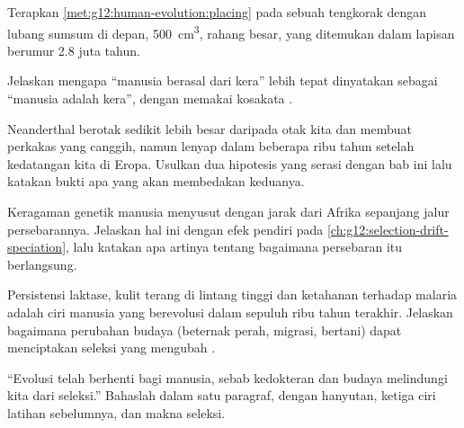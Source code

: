 \begin{exercise}[$\star\star$]\label{exo:g12:human-evolution:10}
Terapkan \cref{met:g12:human-evolution:placing} pada sebuah tengkorak
dengan lubang sumsum di depan, \qty{500}{cm^3}, rahang besar, yang
ditemukan dalam lapisan berumur 2.8 juta tahun.
\end{exercise}

\begin{exercise}[$\star\star$]\label{exo:g12:human-evolution:11}
Jelaskan mengapa ``manusia berasal dari kera'' lebih tepat dinyatakan
sebagai ``manusia adalah kera'', dengan memakai kosakata .
\end{exercise}

\begin{exercise}[$\star\star\star$]\label{exo:g12:human-evolution:12}
Neanderthal berotak sedikit lebih besar daripada otak kita dan membuat
perkakas yang canggih, namun lenyap dalam beberapa ribu tahun setelah
kedatangan kita di Eropa. Usulkan dua hipotesis yang serasi dengan bab
ini lalu katakan bukti apa yang akan membedakan keduanya.
\end{exercise}

\begin{exercise}[$\star\star\star$]\label{exo:g12:human-evolution:13}
Keragaman genetik manusia menyusut dengan jarak dari Afrika sepanjang
jalur persebarannya. Jelaskan hal ini dengan efek pendiri pada
\cref{ch:g12:selection-drift-speciation}, lalu katakan apa artinya
tentang bagaimana persebaran itu berlangsung.
\end{exercise}

\begin{exercise}[$\star\star\star$]\label{exo:g12:human-evolution:14}
Persistensi laktase, kulit terang di lintang tinggi dan ketahanan
terhadap malaria adalah ciri manusia yang berevolusi dalam sepuluh
ribu tahun terakhir. Jelaskan bagaimana perubahan budaya (beternak
perah, migrasi, bertani) dapat menciptakan seleksi yang mengubah .
\end{exercise}

\begin{exercise}[$\star\star\star$]\label{exo:g12:human-evolution:15}
``Evolusi telah berhenti bagi manusia, sebab kedokteran dan budaya
melindungi kita dari seleksi.'' Bahaslah dalam satu paragraf, dengan
hanyutan, ketiga ciri latihan sebelumnya, dan makna seleksi.
\end{exercise}

